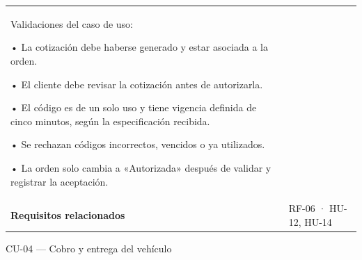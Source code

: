 {\begin{longtable}[]{@{}
  >{\raggedright\arraybackslash}p{}
  >{\raggedright\arraybackslash}p{}@{}}
Validaciones del caso de uso:

• La cotización debe haberse generado y estar asociada a la orden.

• El cliente debe revisar la cotización antes de autorizarla.

• El código es de un solo uso y tiene vigencia definida de cinco
minutos, según la especificación recibida.

• Se rechazan códigos incorrectos, vencidos o ya utilizados.

• La orden solo cambia a «Autorizada» después de validar y registrar la
aceptación. \\
\textbf{Requisitos relacionados} & RF-06 · HU-12, HU-14 \\
\end{longtable}
}

CU-04 --- Cobro y entrega del vehículo

